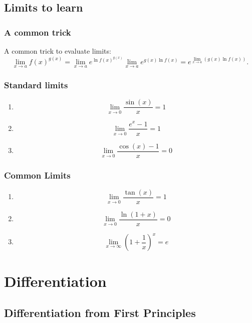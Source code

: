 \documentclass[12pt, a4paper]{article}
\theoremstyle{definition}
\theoremstyle{plain}
\begin{document}
\subsection{Limits to learn}

\subsubsection{A common trick}

A common trick to evaluate limits: $$\lim_{x\to a}f(x)^{g(x)}=\lim_{x\to a} e^{\ln{f(x)^{g(x)}}}\lim_{x\to a}e^{g(x)\ln{f(x)}}=e^{\lim_{x\to a}\left(g(x)\ln{f(x)}\right)}.$$

\subsubsection{Standard limits}

\begin{enumerate}

	\item $$\lim_{x \to 0} \frac{\sin(x)}{x} = 1$$

	\item $$\lim_{x \to 0} \frac{e^x-1}{x} = 1$$

	\item $$\lim_{x \to 0} \frac{\cos(x)-1}{x} = 0$$

\end{enumerate}

\subsubsection{Common Limits}

\begin{enumerate}

	\item $$\lim_{x \to 0} \frac{\tan(x)}{x} = 1$$

	\item $$\lim_{x \to 0} \frac{\ln(1+x)}{x} = 0$$

	\item $$\lim_{x \to \infty} \left(1 + \frac{1}{x} \right)^x = e$$

\end{enumerate}

\section{Differentiation}

\subsection{Differentiation from First Principles}
\end{document}
